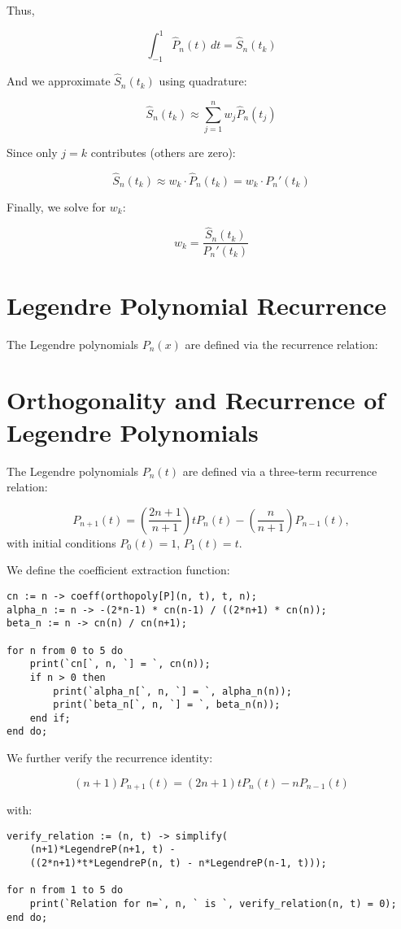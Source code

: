 \documentclass{article}
\begin{document}
Thus,

\[
\int_{-1}^{1} \hat{P}_n(t) \, dt = \hat{S}_n(t_k)
\]

And we approximate \( \hat{S}_n(t_k) \) using quadrature:

\[
\hat{S}_n(t_k) \approx \sum_{j=1}^{n} w_j \hat{P}_n(t_j)
\]

Since only \( j = k \) contributes (others are zero):

\[
\hat{S}_n(t_k) \approx w_k \cdot \hat{P}_n(t_k) = w_k \cdot P_n'(t_k)
\]

Finally, we solve for \( w_k \):

\[
\boxed{
w_k = \frac{\hat{S}_n(t_k)}{P_n'(t_k)}
}
\]



\section{Legendre Polynomial Recurrence}
The Legendre polynomials \( P_n(x) \) are defined via the recurrence relation:
\section{Orthogonality and Recurrence of Legendre Polynomials}

The Legendre polynomials \( P_n(t) \) are defined via a three-term recurrence relation:

\[
P_{n+1}(t) = \left( \frac{2n+1}{n+1} \right) t P_n(t) - \left( \frac{n}{n+1} \right) P_{n-1}(t),
\]
with initial conditions \( P_0(t) = 1 \), \( P_1(t) = t \).

We define the coefficient extraction function:

\begin{lstlisting}[language=Maple, caption={Computing Orthogonal Coefficients}]
cn := n -> coeff(orthopoly[P](n, t), t, n);
alpha_n := n -> -(2*n-1) * cn(n-1) / ((2*n+1) * cn(n));
beta_n := n -> cn(n) / cn(n+1);

for n from 0 to 5 do
    print(`cn[`, n, `] = `, cn(n));
    if n > 0 then
        print(`alpha_n[`, n, `] = `, alpha_n(n));
        print(`beta_n[`, n, `] = `, beta_n(n));
    end if;
end do;
\end{lstlisting}

We further verify the recurrence identity:

\[
(n+1)P_{n+1}(t) = (2n+1)tP_n(t) - nP_{n-1}(t)
\]

with:

\begin{lstlisting}[caption={Verifying Recurrence}]
verify_relation := (n, t) -> simplify(
    (n+1)*LegendreP(n+1, t) -
    ((2*n+1)*t*LegendreP(n, t) - n*LegendreP(n-1, t)));

for n from 1 to 5 do
    print(`Relation for n=`, n, ` is `, verify_relation(n, t) = 0);
end do;
\end{lstlisting}
\end{document}
